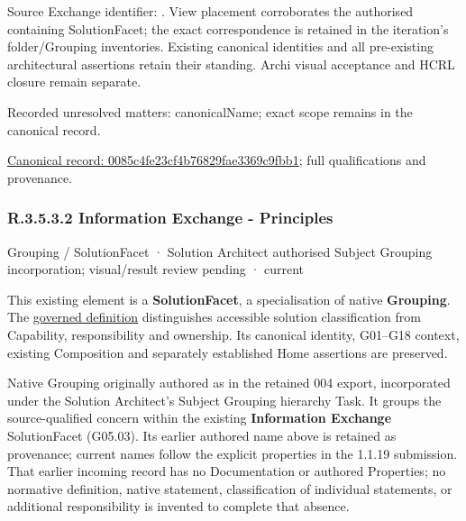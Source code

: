 Source Exchange identifier: \texttt{}. View placement corroborates
the authorised containing SolutionFacet; the exact correspondence is retained in the
iteration's folder/Grouping inventories. Existing canonical identities and all
pre-existing architectural assertions retain their standing. Archi visual
acceptance and HCRL closure remain separate.


{\small Recorded unresolved matters: canonicalName; exact scope remains in the canonical record.}\par
{\footnotesize \href{../../../../../../../continuum/grouping/0085c4fe23cf4b76829fae3369c9fbb1.md}{Canonical record: 0085c4fe23cf4b76829fae3369c9fbb1}; full qualifications and provenance.}\par
\subsubsection*{R.3.5.3.2 Information Exchange - Principles}
\label{navigation:R.3.5.3.2}

\label{element:08ffff9f57aa412b80e36ab154136ad0}
{\small Grouping / SolutionFacet · Solution Architect authorised Subject Grouping incorporation; visual/result review pending · current}\par

This existing element is a \textbf{SolutionFacet}, a specialisation of native
\textbf{Grouping}. The \href{\detokenize{../../../../../../../governance/continuum-representation.md#solutionfacet-classification--1119-candidate}}{governed definition}
distinguishes accessible solution classification from Capability, responsibility
and ownership. Its canonical identity, G01–G18 context, existing Composition
and separately established Home assertions are preserved.



Native Grouping originally authored as \texttt{} in the retained 004 export,
incorporated under the Solution Architect's Subject Grouping hierarchy Task.
It groups the source-qualified \texttt{} concern within
the existing \textbf{Information Exchange} SolutionFacet (G05.03). Its earlier authored name above is retained as provenance; current names
follow the explicit properties in the 1.1.19 submission.
That earlier incoming record has no Documentation or authored Properties; no normative
definition, native statement, classification of individual statements, or
additional responsibility is invented to complete that absence.



